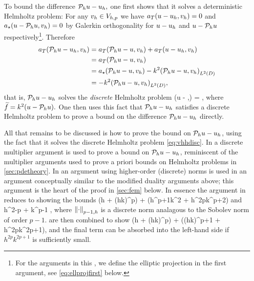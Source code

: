 To bound the difference $\mathcal P_{h} u - u_{h},$ one first shows that it solves a deterministic Helmholtz problem:
For any $v_{h} \in V_{h,p}$ we have $a_{T}(u-u_{h},v_{h}) = 0$ and $a_{\star}(u-\mathcal P_{h} u,v_{h}) = 0$ by Galerkin orthogonality for $u-u_{h}$ and $u-\mathcal P_{h} u$ respectively\footnote{For the arguments in this , we define the elliptic projection in the first argument, see \cref{eq:ellprojfirst} below.}. Therefore
\begin{align*}
  \aT(\Ph u - \uh,\vh) &= \aT(\Ph u - u,\vh) + \aT(u-\uh,\vh)\\
  &= \aT(\Ph u - u,\vh)\\
  &= \aep(\Ph u - u,\vh) - k^2\IPLtD{\Ph u - u}{\vh}\\
  &= - k^2\IPLtD{\Ph u - u}{\vh},
\end{align*}
that is, $\mathcal P_{h} u - u_{h}$ solves the \emph{discrete} Helmholtz problem
\beq\label{eq:vhhdisc}
\aT(\Ph u - \uh,\vh) = \IPLtD{\ftilde}{\vh} \tforall \vh \in \Vhp,
\eeq
where $\ftilde = k^2\mleft(u-\Ph u\mright).$ One then uses this fact that $\mathcal P_{h} u - u_{h}$ satisfies a discrete Helmholtz problem to prove a bound on the difference $\mathcal P_{h} u - u_{h}$ directly.



All that remains to be discussed is how to prove the bound on $\mathcal P_{h} u - u_{h}$, using the fact that it solves the discrete Helmholtz problem \cref{eq:vhhdisc}. In \cite{FeWu:09,FeWu:11,Wu:14} a discrete multiplier argument is used to prove a bound on $\mathcal P_{h} u - u_{h}$, reminiscent of the multiplier arguments used to prove a priori bounds on Helmholtz problems in \cref{sec:pdetheory}. In \cite{DuWu:15} an argument using higher-order (discrete) norms is used in an argument conceptually similar to the modified duality arguments above; this argument is the heart of the proof in \cref{sec:fem} below. In essence the argument in \cite{DuWu:15} reduces to showing the bounds
\beq\label{eq:duwu1}
 \lesssim \mleft(h + \mleft(hk\mright)^p\mright) + \mleft(h^{p+1}k^2 + h^{2p}k^{p+2}\mright)
\eeq
and
\beq\label{eq:duwu2}
 \lesssim h^{2-p}  + k^{p-1} ,
\eeq
where $\Nfn{p-1,h}{\cdot}$ is a discrete norm analagous to the Sobolev norm of order $p-1$.  are then combined to show
\beqs
{} \lesssim \mleft(h + \mleft(hk\mright)^p\mright) + \mleft(\mleft(hk\mright)^{p+1} + h^{2p}k^{2p+1}\mright),
\eeqs
and the final term can be absorbed into the left-hand side if $h^{2p}k^{2p+1}$ is sufficiently small.

